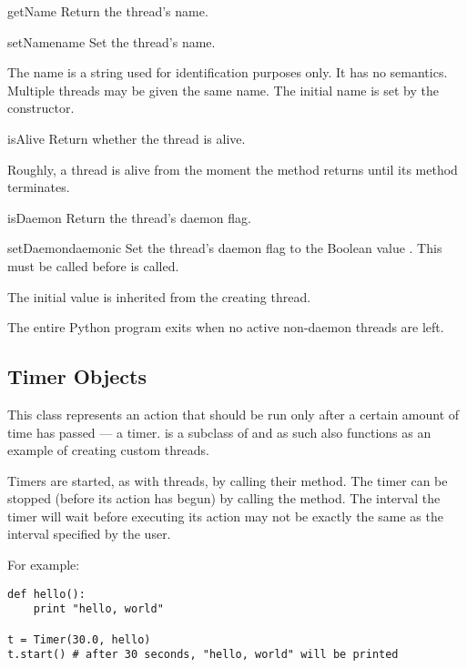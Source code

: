 \begin{methoddesc}{getName}{}
Return the thread's name.
\end{methoddesc}

\begin{methoddesc}{setName}{name}
Set the thread's name.

The name is a string used for identification purposes only.
It has no semantics.  Multiple threads may be given the same
name.  The initial name is set by the constructor.
\end{methoddesc}

\begin{methoddesc}{isAlive}{}
Return whether the thread is alive.

Roughly, a thread is alive from the moment the  method
returns until its  method terminates.
\end{methoddesc}

\begin{methoddesc}{isDaemon}{}
Return the thread's daemon flag.
\end{methoddesc}

\begin{methoddesc}{setDaemon}{daemonic}
Set the thread's daemon flag to the Boolean value .
This must be called before  is called.

The initial value is inherited from the creating thread.

The entire Python program exits when no active non-daemon
threads are left.
\end{methoddesc}


\subsection{Timer Objects \label{timer-objects}}

This class represents an action that should be run only after a certain amount
of time has passed --- a timer.  is a subclass of  and
as such also functions as an example of creating custom threads.

Timers are started, as with threads, by calling their  method. The
timer can be stopped (before its action has begun) by calling the
 method. The interval the timer will wait before executing
its action may not be exactly the same as the interval specified by the
user.

For example:
\begin{verbatim}
def hello():
    print "hello, world"

t = Timer(30.0, hello)
t.start() # after 30 seconds, "hello, world" will be printed
\end{verbatim}

